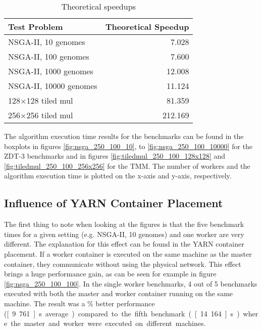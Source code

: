 \begin{table}
  \centering
  \caption{Theoretical speedups}
  \begin{tabular}{lr}\toprule[2pt]
    Test Problem & Theoretical Speedup \\ \midrule
    NSGA-II, 10 genomes & 7.028 \\
    NSGA-II, 100 genomes & 7.600 \\
    NSGA-II, 1000 genomes & 12.008 \\
    NSGA-II, 10000 genomes & 11.124 \\
    128$\times$128 tiled mul & 81.359 \\
    256$\times$256 tiled mul & 212.169 \\ \bottomrule[2pt]
  \end{tabular}
  \label{table:theoretical_speedup}
\end{table}


The algorithm execution time results for the benchmarks can be found in the boxplots in figures \ref{fig:nsga_250_100_10}, to \ref{fig:nsga_250_100_10000} for the ZDT-3 benchmarks and in figures \ref{fig:tiledmul_250_100_128x128} and \ref{fig:tiledmul_250_100_256x256} for the TMM. The number of workers and the algorithm execution time is plotted on the x-axis and y-axis, respectively.

\subsection{Influence of YARN Container Placement}
The first thing to note when looking at the figures is that the five benchmark times for a given setting (e.g. NSGA-II, 10 genomes) and one worker are very different. The explanation for this effect can be found in the YARN container placement. If a worker container is executed on the same machine as the master container, they communicate without using the physical network. This effect brings a huge performance gain, as can be seen for example in figure \ref{fig:nsga_250_100_100}. In the single worker benchmarks, 4 out of 5 benchmarks executed with both the master and worker container running on the same machine. The result was a \unit[50]{\%} better performance (\unit[9.761]{s} average) compared to the fifth benchmark (\unit[14.164]{s}) where the master and worker were executed on different machines.


